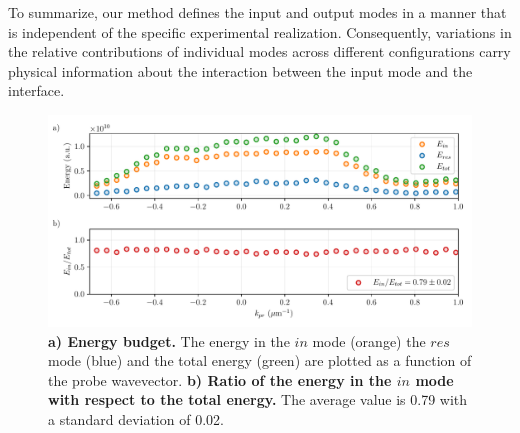 To summarize, our method defines the input and output modes in a manner that is independent of the specific experimental realization. Consequently, variations in the relative contributions of individual modes across different configurations carry physical information about the interaction between the input mode and the interface. 
 \begin{figure}
    \centering
    \includegraphics[width=1\textwidth]{chap_stimulated_hawking/fig/energy_budget.pdf}
    \caption{\textbf{a) Energy budget.} The energy in the $in$ mode (orange) the $res$ mode (blue) and the total energy (green) are plotted as a function of the probe wavevector. 
    \textbf{b) Ratio of the energy in the $in$ mode with respect to the total energy.} The average value is 0.79 with a standard deviation of 0.02.}
    \label{fig:energy_budget}
 \end{figure}

\bigskip

